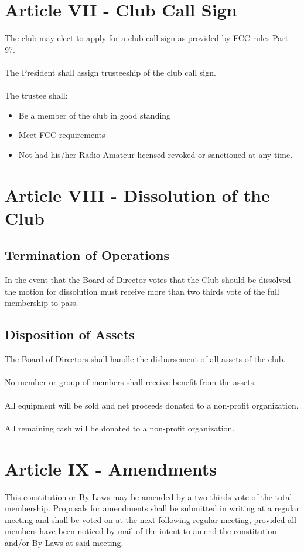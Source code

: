 \documentclass[english,12pt,letterpaper]{article}
\begin{document}
	\section{Article VII - Club Call Sign}
	The club may elect to apply for a club call sign as provided by FCC rules Part 97. \\
	\\
	The President shall assign trusteeship of the club call sign. \\
	\\
	The trustee shall: \\
	\begin{itemize}
		\item Be a member of the club in good standing
		\item Meet FCC requirements
		\item Not had his/her Radio Amateur licensed revoked or sanctioned at any time.
	\end{itemize}
	\section{Article VIII - Dissolution of the Club}
	\subsection{Termination of Operations}
	In the event that the Board of Director votes that the Club should be dissolved the motion for dissolution must receive more than two thirds vote of the full membership to pass.
	\subsection{Disposition of Assets}
	The Board of Directors shall handle the disbursement of all assets of the club. \\
	\\
	No member or group of members shall receive benefit from the assets. \\
	\\
	All equipment will be sold and net proceeds donated to a non-profit organization. \\
	\\
	All remaining cash will be donated to a non-profit organization.
	\section{Article IX - Amendments}
	This constitution or By-Laws may be amended by a two-thirds vote of the total membership. Proposals for amendments shall be submitted in writing at a regular meeting and shall be voted on at the next following regular meeting, provided all members have been noticed by mail of the intent to amend the constitution and/or By-Laws at said meeting.
\end{document}
